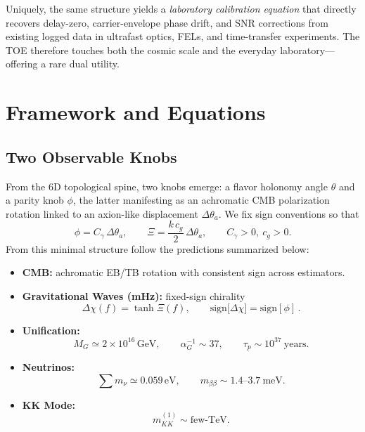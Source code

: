 \documentclass[11pt]{article}
\begin{document}
Uniquely, the same structure yields a \emph{laboratory calibration equation} that directly recovers delay-zero, carrier-envelope phase drift, and SNR corrections from existing logged data in ultrafast optics, FELs, and time-transfer experiments. The TOE therefore touches both the cosmic scale and the everyday laboratory---offering a rare dual utility.

\section{Framework and Equations}

\subsection{Two Observable Knobs}

From the 6D topological spine, two knobs emerge: a flavor holonomy angle $\theta$ and a parity knob $\phi$, the latter manifesting as an achromatic CMB polarization rotation linked to an axion-like displacement $\Delta\theta_a$. We fix sign conventions so that
\begin{equation}
\label{eq:phixi}
\phi = C_\gamma\, \Delta \theta_a, 
\qquad 
\Xi = \frac{k\, c_g}{2}\, \Delta \theta_a,
\qquad 
C_\gamma > 0,\ c_g > 0.
\end{equation}
From this minimal structure follow the predictions summarized below:
\begin{itemize}[leftmargin=2em]
    \item \textbf{CMB:} achromatic EB/TB rotation with consistent sign across estimators.
    \item \textbf{Gravitational Waves (mHz):} fixed-sign chirality
    \begin{equation}
        \Delta \chi(f) = \tanh \Xi(f), \qquad \mathrm{sign}\big[\Delta \chi\big] = \mathrm{sign}[\phi]\, .
    \end{equation}
    \item \textbf{Unification:} 
    \begin{equation}
        M_G \simeq 2 \times 10^{16}\,\mathrm{GeV}, \qquad \alpha_G^{-1} \sim 37, \qquad \tau_p \sim 10^{37}\ \mathrm{years}.
    \end{equation}
    \item \textbf{Neutrinos:}
    \begin{equation}
        \sum m_\nu \simeq 0.059\,\mathrm{eV}, \qquad m_{\beta\beta} \sim 1.4\text{--}3.7~\mathrm{meV}.
    \end{equation}
    \item \textbf{KK Mode:} 
    \begin{equation}
        m^{(1)}_{KK} \sim \mathrm{few\text{-}TeV}.
    \end{equation}
\end{itemize}
\end{document}
